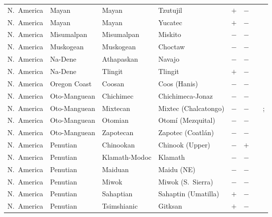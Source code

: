 \begin{landscape}
\begin{longtable}{l>{\raggedright\arraybackslash}p{2.2cm}>{\raggedright}p{2.5cm}>{\raggedright\arraybackslash}p{2.5cm}cc>{\raggedright\arraybackslash}p{3.4cm}>{\raggedright\arraybackslash}p{3.4cm}}
N.~America & Mayan & Mayan & Tzutujil & $+$ & $-$ & \citealt[301]{Nichols1992} & \citealt[301]{Nichols1992}\\
N.~America & Mayan & Mayan & Yucatec & $+$ & $-$ & \citealt{Gil2013} & \citealt[66, 69]{Brody2004}\\
N.~America & Misumalpan & Misumalpan & Miskito & $-$ & $-$ & \citealt{Gil2013} & \citealt[56]{Heath1913}\\
N.~America & Muskogean & Muskogean & Choctaw & $-$ & $-$ & \citealt{Gil2013} & \citealt[passim]{Davies1986}\\
N.~America & Na-Dene & Athapaskan & Navajo & $-$ & $-$ & \citealt{Gil2013} & \citealt[299]{Nichols1992}\\
N.~America & Na-Dene & Tlingit & Tlingit & $+$ & $-$ & \citealt{Gil2013} & \citealt[passim]{Boas1917}\\
N.~America & Oregon Coast & Coosan & Coos (Hanis) & $-$ & $-$ & \citealt{Gil2013} & \citealt{Corbett2013}\\
N.~America & Oto-Manguean & Chichimec & Chichimeca-Jonaz & $-$ & $-$ & \citealt{Gil2013} & \citealt[23--30]{Suarez1984}\\
N.~America & Oto-Manguean & Mixtecan & Mixtec (Chalcatongo) & $-$ & $-$ & \citealt{Gil2013} & \citealt{Corbett2013}; \citealt[81--85]{Macaulay1996}\\
N.~America & Oto-Manguean & Otomian & Otomí (Mezquital) & $-$ & $-$ & \citealt[passim]{Hess1968} & \citealt[passim]{Hess1968}\\
N.~America & Oto-Manguean & Zapotecan & Zapotec (Coatlán) & $-$ & $-$ & \citealt[passim]{BeamdeAzcona2004} & \citealt[passim]{BeamdeAzcona2004}\\
N.~America & Penutian & Chinookan & Chinook (Upper) & $-$ & $+$ & \citealt{Gil2013} & \citealt[72--75, 214]{Hymes1955}\\
N.~America & Penutian & Klamath-Modoc & Klamath & $-$ & $-$ & \citealt{Gil2013} & \citealt[448--451]{Mithun2001}\\
N.~America & Penutian & Maiduan & Maidu (NE) & $-$ & $-$ & \citealt{Gil2013} & \citealt[299]{Nichols1992}\\
N.~America & Penutian & Miwok & Miwok (S.~Sierra) & $-$ & $-$ & \citealt{Gil2013} & \citealt{Corbett2013}\\
N.~America & Penutian & Sahaptian & Sahaptin (Umatilla) & $+$ & $-$ & \citealt[299]{Nichols1992} & \citealt[299]{Nichols1992}\\
N.~America & Penutian & Tsimshianic & Gitksan & $+$ & $-$ & \citealt[299]{Nichols1992} & \citealt[passim]{Hunt1993}\\

\end{longtable}
\end{landscape}
